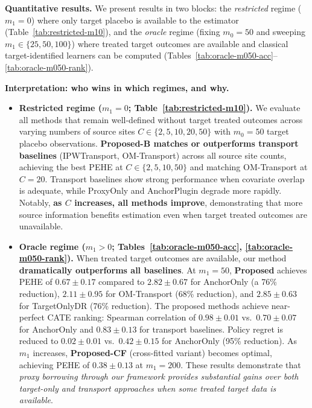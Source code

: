 {{\medskip
\noindent\textbf{Quantitative results.}
We present results in two blocks: the \emph{restricted} regime ($m_1=0$) where only target placebo is available to the estimator (Table~\ref{tab:restricted-m10}), and the \emph{oracle} regime (fixing $m_0=50$ and sweeping $m_1\in\{25,50,100\}$) where treated target outcomes are available and classical target-identified learners can be computed (Tables~\ref{tab:oracle-m050-acc}--\ref{tab:oracle-m050-rank}).










\medskip
\noindent\textbf{Interpretation: who wins in which regimes, and why.}
\begin{itemize}
\item \textbf{Restricted regime ($m_1=0$; Table~\ref{tab:restricted-m10}).}
We evaluate all methods that remain well-defined without target treated outcomes across varying numbers of source sites $C \in \{2, 5, 10, 20, 50\}$ with $m_0=50$ target placebo observations.
\textbf{Proposed-B matches or outperforms transport baselines} (IPWTransport, OM-Transport) across all source site counts, achieving the best PEHE at $C \in \{2, 5, 10, 50\}$ and matching OM-Transport at $C=20$.
Transport baselines show strong performance when covariate overlap is adequate, while ProxyOnly and AnchorPlugin degrade more rapidly.
Notably, \textbf{as $C$ increases, all methods improve}, demonstrating that more source information benefits estimation even when target treated outcomes are unavailable.

\item \textbf{Oracle regime ($m_1>0$; Tables~\ref{tab:oracle-m050-acc}, \ref{tab:oracle-m050-rank}).}
When treated target outcomes are available, our method \textbf{dramatically outperforms all baselines}. 
At $m_1=50$, \textbf{Proposed} achieves PEHE of $0.67 \pm 0.17$ compared to $2.82 \pm 0.67$ for AnchorOnly (a 76\% reduction), $2.11 \pm 0.95$ for OM-Transport (68\% reduction), and $2.85 \pm 0.63$ for TargetOnlyDR (76\% reduction).
The proposed methods achieve near-perfect CATE ranking: Spearman correlation of $0.98 \pm 0.01$ vs.\ $0.70 \pm 0.07$ for AnchorOnly and $0.83 \pm 0.13$ for transport baselines.
Policy regret is reduced to $0.02 \pm 0.01$ vs.\ $0.42 \pm 0.15$ for AnchorOnly (95\% reduction).
As $m_1$ increases, \textbf{Proposed-CF} (cross-fitted variant) becomes optimal, achieving PEHE of $0.38 \pm 0.13$ at $m_1=200$.
These results demonstrate that \emph{proxy borrowing through our framework provides substantial gains over both target-only and transport approaches when some treated target data is available}.
\end{itemize}


}
}

